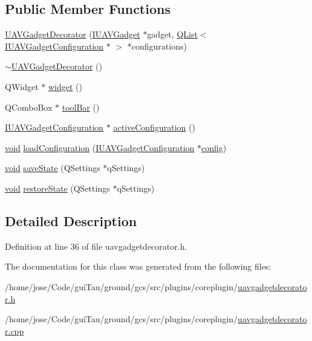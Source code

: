 \subsection*{Public Member Functions}
\begin{DoxyCompactItemize}
\item 
\hyperlink{group___core_plugin_gac6e67785f34247cf49bcd7887544e794}{U\-A\-V\-Gadget\-Decorator} (\hyperlink{class_core_1_1_i_u_a_v_gadget}{I\-U\-A\-V\-Gadget} $\ast$gadget, \hyperlink{class_q_list}{Q\-List}$<$ \hyperlink{class_core_1_1_i_u_a_v_gadget_configuration}{I\-U\-A\-V\-Gadget\-Configuration} $\ast$ $>$ $\ast$configurations)
\item 
\hyperlink{group___core_plugin_ga2ece0a42a537670450430731ea9a1d20}{$\sim$\-U\-A\-V\-Gadget\-Decorator} ()
\item 
Q\-Widget $\ast$ \hyperlink{group___core_plugin_ga12c4f62b462010a4f8075426f3df13bc}{widget} ()
\item 
Q\-Combo\-Box $\ast$ \hyperlink{group___core_plugin_ga8c9668cf01fa97af0f95ab606ff46ec5}{tool\-Bar} ()
\item 
\hyperlink{class_core_1_1_i_u_a_v_gadget_configuration}{I\-U\-A\-V\-Gadget\-Configuration} $\ast$ \hyperlink{group___core_plugin_ga8df27a3c2e778b33daa795e69b087119}{active\-Configuration} ()
\item 
\hyperlink{group___u_a_v_objects_plugin_ga444cf2ff3f0ecbe028adce838d373f5c}{void} \hyperlink{group___core_plugin_ga2cb86d2fb668e30c63e1438984b7ec76}{load\-Configuration} (\hyperlink{class_core_1_1_i_u_a_v_gadget_configuration}{I\-U\-A\-V\-Gadget\-Configuration} $\ast$\hyperlink{deflate_8c_a4473b5227787415097004fd39f55185e}{config})
\item 
\hyperlink{group___u_a_v_objects_plugin_ga444cf2ff3f0ecbe028adce838d373f5c}{void} \hyperlink{group___core_plugin_gac05eb0306b2ea9df605c375ec35826d3}{save\-State} (Q\-Settings $\ast$q\-Settings)
\item 
\hyperlink{group___u_a_v_objects_plugin_ga444cf2ff3f0ecbe028adce838d373f5c}{void} \hyperlink{group___core_plugin_ga13653640feaa74b1fec61e88c82406ae}{restore\-State} (Q\-Settings $\ast$q\-Settings)
\end{DoxyCompactItemize}


\subsection{Detailed Description}


Definition at line 36 of file uavgadgetdecorator.\-h.



The documentation for this class was generated from the following files\-:\begin{DoxyCompactItemize}
\item 
/home/jose/\-Code/gui\-Tau/ground/gcs/src/plugins/coreplugin/\hyperlink{uavgadgetdecorator_8h}{uavgadgetdecorator.\-h}\item 
/home/jose/\-Code/gui\-Tau/ground/gcs/src/plugins/coreplugin/\hyperlink{uavgadgetdecorator_8cpp}{uavgadgetdecorator.\-cpp}\end{DoxyCompactItemize}
